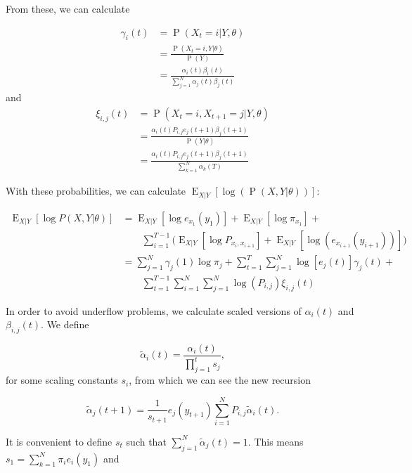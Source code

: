 \documentclass{article}
\DeclareMathOperator{\Prob}{P}
\DeclareMathOperator{\E}{E}
\begin{document}
From these, we can calculate 

\begin{align*}
    \gamma_i(t) &= \Prob(X_t=i|Y,\theta) \\
                &= \frac{\Prob(X_t=i,Y|\theta)}{\Prob(Y)}\\
                &= \frac{\alpha_i(t)\beta_i(t)}
                    {\sum_{j=1}^N\alpha_j(t)\beta_j(t)}
\end{align*}
and
\begin{align*}
    \xi_{i,j}(t) &= \Prob(X_t=i,X_{t+1}=j|Y,\theta) \\
                 &= \frac{\alpha_i(t)P_{i,j}e_j(t+1)\beta_j(t+1)}
                       {\Prob(Y|\theta)}\\
                 &= \frac{\alpha_i(t)P_{i,j}e_j(t+1)\beta_j(t+1)}
                       {\sum_{k=1}^N\alpha_k(T)}
\end{align*}

With these probabilities, we can calculate $\E_{X|Y}[\log(\Prob(X,Y|\theta))]$:

\begin{align*}
    \E_{X|Y}\left[\log P\left(X,Y|\theta\right)\right] &= 
        \E_{X|Y}\left[\log e_{x_1}(y_1)\right] + 
        \E_{X|Y}\left[\log \pi_{x_1}\right] + \\
        &\qquad
        \sum_{i=1}^{T-1}\bigg(\E_{X|Y}\left[\log P_{x_i,x_{i+1}}\right] +
        \E_{X|Y}\left[\log(e_{x_{i+1}}(y_{i+1}))\right]\bigg)\\
        &= \sum_{j=1}^N\gamma_j(1) \log \pi_j + 
        \sum_{t=1}^T\sum_{j=1}^N\log\left[e_j(t)\right]\gamma_j(t)+\\
        &\qquad\sum_{t=1}^{T-1}\sum_{i=1}^N\sum_{j=1}^N\log(P_{i,j})\xi_{i,j}(t)
\end{align*}

In order to avoid underflow problems, we calculate scaled versions of
$\alpha_i(t)$ and $\beta_{i,j}(t)$. We define 

\begin{equation}
    \tilde{\alpha}_i(t) = \frac{\alpha_i(t)}{\prod_{j=1}^t s_j},
\end{equation}
for some scaling constants $s_i$, from which we can see the new recursion

\begin{equation}
    \tilde{\alpha}_j(t+1) = \frac{1}{s_{t+1}}e_j(y_{t+1})
        \sum_{i=1}^NP_{i,j}\tilde{\alpha}_i(t).
\end{equation}

It is convenient to define $s_t$ such that 
$\sum_{j=1}^N \tilde{\alpha}_j(t) = 1$. This means 
$s_1 = \sum_{k=1}^N \pi_i e_i(y_1)$ and 
\end{document}
